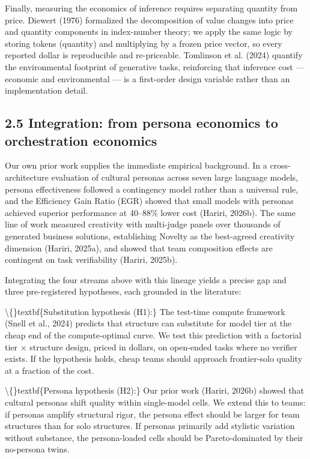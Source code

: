 \documentclass[11pt,a4paper]{article}
\begin{document}
Finally, measuring the economics of inference requires separating quantity
from price. Diewert (1976) formalized the decomposition of value changes
into price and quantity components in index-number theory; we apply the same
logic by storing tokens (quantity) and multiplying by a frozen price vector,
so every reported dollar is reproducible and re-priceable. Tomlinson et al.
(2024) quantify the environmental footprint of generative tasks, reinforcing
that inference cost — economic and environmental — is a first-order design
variable rather than an implementation detail.

\subsection{2.5 Integration: from persona economics to orchestration economics}

Our own prior work supplies the immediate empirical background. In a
cross-architecture evaluation of cultural personas across seven large
language models, persona effectiveness followed a contingency model rather
than a universal rule, and the Efficiency Gain Ratio (EGR) showed that small
models with personas achieved superior performance at 40–88\% lower cost
(Hariri, 2026b). The same line of work measured creativity with multi-judge
panels over thousands of generated business solutions, establishing
Novelty as the best-agreed creativity dimension (Hariri, 2025a), and showed
that team composition effects are contingent on task verifiability
(Hariri, 2025b).

Integrating the four streams above with this lineage yields a precise gap
and three pre-registered hypotheses, each grounded in the literature:

\textbackslash\{\}textbf\{Substitution hypothesis (H1):\} The test-time compute framework (Snell et
al., 2024) predicts that structure can substitute for model tier at the
cheap end of the compute-optimal curve. We test this prediction with a
factorial tier × structure design, priced in dollars, on open-ended tasks
where no verifier exists. If the hypothesis holds, cheap teams should
approach frontier-solo quality at a fraction of the cost.

\textbackslash\{\}textbf\{Persona hypothesis (H2):\} Our prior work (Hariri, 2026b) showed that
cultural personas shift quality within single-model cells. We extend this
to teams: if personas amplify structural rigor, the persona effect should be
larger for team structures than for solo structures. If personas primarily
add stylistic variation without substance, the persona-loaded cells should
be Pareto-dominated by their no-persona twins.
\end{document}
